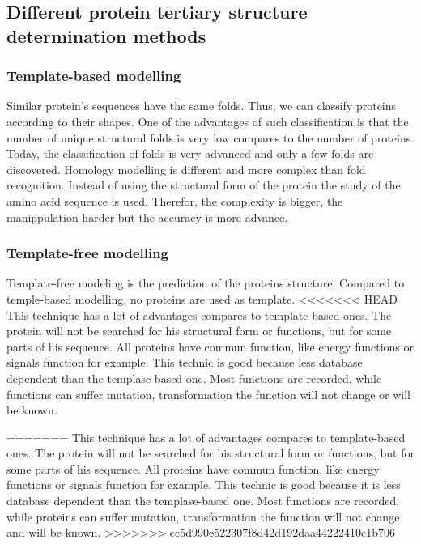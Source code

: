 \subsection{Different protein tertiary structure determination methods} 
\subsubsection{Template-based modelling}
Similar protein's sequences have the same folds. Thus, we can classify proteins according to their shapes. One of the advantages of such classification is that the number of unique structural folds is very low compares to the number of proteins.
\newline
Today, the classification of folds is very advanced and only a few folds are discovered.
Homology modelling is different and more complex than fold recognition. Instead of using the structural form of the protein the study of the amino acid sequence is used. Therefor, the complexity is bigger, the manippulation harder but the accuracy is more advance.

\subsubsection{Template-free modelling}
Template-free modeling is the prediction of the proteins structure. Compared to temple-based modelling, no proteins are used as template. 
<<<<<<< HEAD
\newline This technique has a lot of advantages compares to template-based ones. The protein will not be searched for his structural form or functions, but for some parts of his sequence. All proteins have commun function,  like energy functions or signals function for example. This technic is good because less database dependent than the templase-based one. Most functions are recorded, while functions can suffer mutation, transformation the function will not change or will be known.

=======
\newline
This technique has a lot of advantages compares to template-based ones. The protein will not be searched for his structural form or functions, but for some parts of his sequence. All proteins have commun function,  like energy functions or signals function for example. This technic is good because it is less database dependent than the templase-based one. Most functions are recorded, while proteins can suffer mutation, transformation the function will not change and will be known.
>>>>>>> cc5d990e522307f8d42d192daa44222410c1b706
